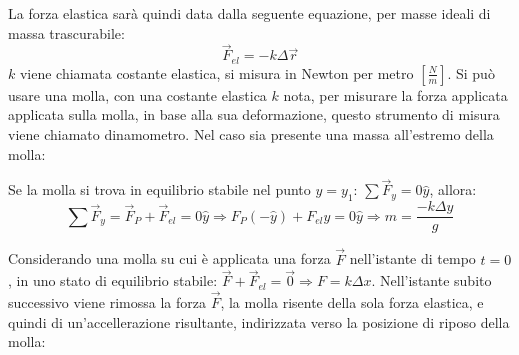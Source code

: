 \documentclass{article}
\numberwithin{equation}{subsection}
\begin{document}
La forza elastica sarà quindi data dalla seguente equazione, per 
masse ideali di massa trascurabile: 
\begin{equation}
    \vec{F}_{el}=-k\Delta\vec{r}
\end{equation}
$k$ viene chiamata costante 
elastica, si misura in Newton per metro $\left[\displaystyle\frac{N}{m}\right]$. 
Si può usare una molla, con una costante elastica $k$ 
nota, per misurare la forza applicata applicata sulla molla, 
in base alla sua deformazione, questo strumento di misura 
viene chiamato dinamometro. Nel caso sia 
presente una massa all'estremo della molla:

\begin{center}\end{center}

Se la molla si trova in equilibrio stabile nel punto $y=y_1$: $\sum\vec{F}_y=0\hat{y}$, 
allora:
\begin{equation}
    \sum\vec{F}_y=\vec{F}_P+\vec{F}_{el}=0\hat{y}\Rightarrow F_P(-\hat{y})+F_{el}\hat{y}=0\hat{y}\Rightarrow m=\displaystyle\frac{-k\Delta y}{g}
\end{equation}

Considerando una molla su cui è applicata una forza $\vec{F}$ nell'istante 
di tempo $t=0$, in uno stato di equilibrio stabile: 
$\vec{F}+\vec{F}_{el}=\vec{0}\Rightarrow F=k\Delta x$. 
Nell'istante subito successivo viene rimossa la forza $\vec{F}$, 
la molla risente della sola forza elastica, e quindi
di un'accellerazione risultante, indirizzata 
verso la posizione di riposo della molla:

\begin{center}\end{center} 
\end{document}
